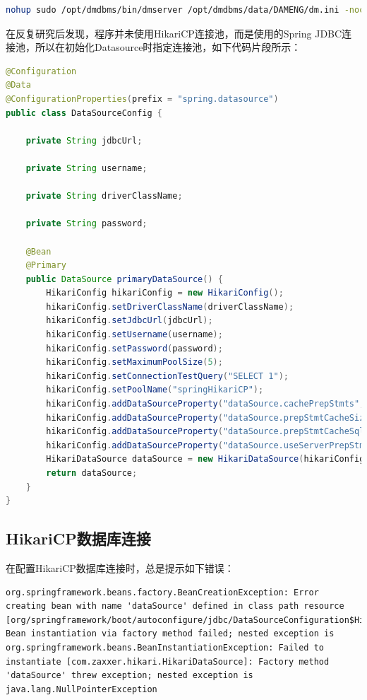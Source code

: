 \documentclass[letter]{book}
\begin{document}
\begin{lstlisting}[language=Bash]
nohup sudo /opt/dmdbms/bin/dmserver /opt/dmdbms/data/DAMENG/dm.ini -noconsole &
\end{lstlisting}

在反复研究后发现，程序并未使用HikariCP连接池，而是使用的Spring JDBC连接池，所以在初始化Datasource时指定连接池，如下代码片段所示：

\begin{lstlisting}[language=Java]
@Configuration
@Data
@ConfigurationProperties(prefix = "spring.datasource")
public class DataSourceConfig {

	private String jdbcUrl;
	
	private String username;
	
	private String driverClassName;
	
	private String password;
	
	@Bean
	@Primary
	public DataSource primaryDataSource() {
		HikariConfig hikariConfig = new HikariConfig();
		hikariConfig.setDriverClassName(driverClassName);
		hikariConfig.setJdbcUrl(jdbcUrl);
		hikariConfig.setUsername(username);
		hikariConfig.setPassword(password);
		hikariConfig.setMaximumPoolSize(5);
		hikariConfig.setConnectionTestQuery("SELECT 1");
		hikariConfig.setPoolName("springHikariCP");
		hikariConfig.addDataSourceProperty("dataSource.cachePrepStmts", "true");
		hikariConfig.addDataSourceProperty("dataSource.prepStmtCacheSize", "250");
		hikariConfig.addDataSourceProperty("dataSource.prepStmtCacheSqlLimit", "2048");
		hikariConfig.addDataSourceProperty("dataSource.useServerPrepStmts", "true");
		HikariDataSource dataSource = new HikariDataSource(hikariConfig);
		return dataSource;
	}
}
\end{lstlisting}

\subsection{HikariCP数据库连接}

在配置HikariCP数据库连接时，总是提示如下错误：

\begin{lstlisting}
org.springframework.beans.factory.BeanCreationException: Error creating bean with name 'dataSource' defined in class path resource [org/springframework/boot/autoconfigure/jdbc/DataSourceConfiguration$Hikari.class]: Bean instantiation via factory method failed; nested exception is org.springframework.beans.BeanInstantiationException: Failed to instantiate [com.zaxxer.hikari.HikariDataSource]: Factory method 'dataSource' threw exception; nested exception is java.lang.NullPointerException
\end{lstlisting}
\end{document}
